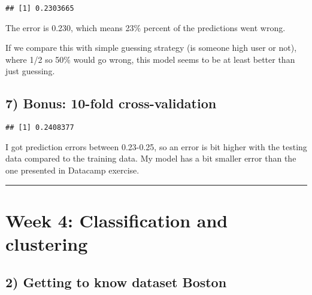 \documentclass[]{article}
\newenvironment{Shaded}{\begin{snugshade}}{\end{snugshade}}
\newcommand{\KeywordTok}[1]{\textcolor[rgb]{0.13,0.29,0.53}{\textbf{#1}}}
\newcommand{\DataTypeTok}[1]{\textcolor[rgb]{0.13,0.29,0.53}{#1}}
\newcommand{\DecValTok}[1]{\textcolor[rgb]{0.00,0.00,0.81}{#1}}
\newcommand{\StringTok}[1]{\textcolor[rgb]{0.31,0.60,0.02}{#1}}
\newcommand{\OperatorTok}[1]{\textcolor[rgb]{0.81,0.36,0.00}{\textbf{#1}}}
\newcommand{\NormalTok}[1]{#1}
\begin{document}
\begin{verbatim}
## [1] 0.2303665
\end{verbatim}

The error is 0.230, which means 23\% percent of the predictions went
wrong.

If we compare this with simple guessing strategy (is someone high user
or not), where 1/2 so 50\% would go wrong, this model seems to be at
least better than just guessing.

\subsection{7) Bonus: 10-fold
cross-validation}\label{bonus-10-fold-cross-validation}

\begin{Shaded}
\end{Shaded}

\begin{verbatim}
## [1] 0.2408377
\end{verbatim}

I got prediction errors between 0.23-0.25, so an error is bit higher
with the testing data compared to the training data. My model has a bit
smaller error than the one presented in Datacamp exercise.

\begin{center}\rule{0.5\linewidth}{\linethickness}\end{center}

\section{Week 4: Classification and
clustering}\label{week-4-classification-and-clustering}

\subsection{2) Getting to know dataset
Boston}\label{getting-to-know-dataset-boston}
\end{document}
